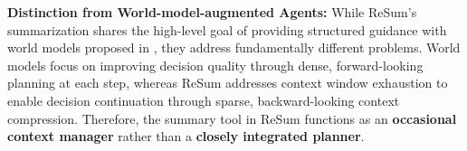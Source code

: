 \textbf{Distinction from World-model-augmented Agents:} While ReSum's summarization shares the high-level goal of providing structured guidance with world models proposed in \cite{chae2025web}, they address fundamentally different problems. World models focus on improving decision quality through dense, forward-looking planning at each step, whereas ReSum addresses context window exhaustion to enable decision continuation through sparse, backward-looking context compression. Therefore, the summary tool in ReSum functions as an \textbf{occasional context manager} rather than a \textbf{closely integrated planner}.
